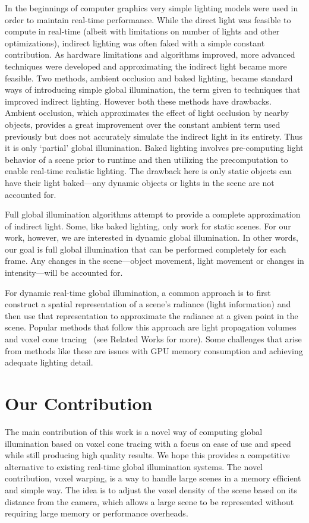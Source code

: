 In the beginnings of computer graphics very simple lighting models were used in order to maintain real-time performance. While the direct light was feasible to compute in real-time (albeit with limitations on number of lights and other optimizations), indirect lighting was often faked with a simple constant contribution. As hardware limitations and algorithms improved, more advanced techniques were developed and approximating the indirect light became more feasible. Two methods, ambient occlusion and baked lighting, became standard ways of introducing simple global illumination, the term given to techniques that improved indirect lighting. However both these methods have drawbacks. Ambient occlusion, which approximates the effect of light occlusion by nearby objects, provides a great improvement over the constant ambient term used previously but does not accurately simulate the indirect light in its entirety. Thus it is only `partial' global illumination. Baked lighting involves pre-computing light behavior of a scene prior to runtime and then utilizing the precomputation to enable real-time realistic lighting. The drawback here is only static objects can have their light baked---any dynamic objects or lights in the scene are not accounted for.

Full global illumination algorithms attempt to provide a complete approximation of indirect light. Some, like baked lighting, only work for static scenes. For our work, however, we are interested in dynamic global illumination. In other words, our goal is full global illumination that can be performed completely for each frame. Any changes in the scene---object movement, light movement or changes in intensity---will be accounted for.

For dynamic real-time global illumination, a common approach is to first construct a spatial representation of a scene's radiance (light information) and then use that representation to approximate the radiance at a given point in the scene. Popular methods that follow this approach are light propagation volumes~\cite{kaplanyan2010cascaded} and voxel cone tracing~\cite{crassin2011interactive} (see Related Works for more). Some challenges that arise from methods like these are issues with GPU memory consumption and achieving adequate lighting detail. %

\section{Our Contribution}
The main contribution of this work is a novel way of computing global illumination based on voxel cone tracing with a focus on ease of use and speed while still producing high quality results. We hope this provides a competitive alternative to existing real-time global illumination systems. The novel contribution, voxel warping, is a way to handle large scenes in a memory efficient and simple way. The idea is to adjust the voxel density of the scene based on its distance from the camera, which allows a large scene to be represented without requiring large memory or performance overheads.

